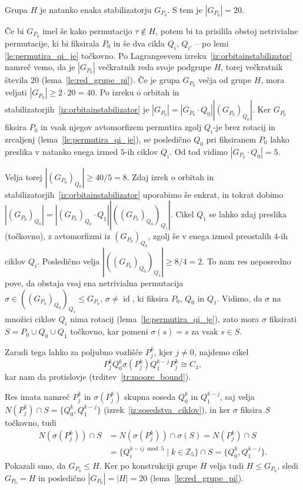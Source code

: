 \documentclass[fin1, tisk]{fmfdelo}
\newcommand{\id}{\operatorname{id}}
\begin{document}
\begin{lema}
    Grupa $H$ je natanko enaka stabilizatorju $G_{P_0}$.
    S tem je $|G_{P_0}| = 20$.
\end{lema}
\begin{dokaz}
    Če bi $G_{P_0}$ imel še kako permutacijo $\tau \not\in H$,
    potem bi ta prisilila obstoj netrivialne permutacije, ki bi fiksirala $P_0$
    in še dva cikla $Q_i$, $Q_{i'}$ -- po lemi \ref{le:permutira_qi_je} točkovno. Po Lagrangeevem izreku~\ref{iz:orbitainstabilizator} 
    namreč vemo, da je $|G_{P_0}|$ večkratnik reda svoje podgrupe $H$, torej večkratnik
    števila $20$ (lema~\ref{le:red_grupe_pi}). Če je grupa $G_{P_0}$ večja od grupe $H$, 
    mora veljati $|G_{P_0}| \geq 2\cdot20 = 40$. Po izreku o orbitah in 
    stabilizatorjih~\ref{iz:orbitainstabilizator} 
    je $|G_{P_0}| = |G_{P_0}\cdot Q_0||(G_{P_0})_{Q_0}|$.
    Ker $G_{P_0}$ fiksira $P_0$ in vsak njegov avtomorfizem permutira zgolj $Q_i$-je brez 
    rotacij in zrcaljenj (lema~\ref{le:permutira_qi_je}), se posledično $Q_0$ pri fiksiranem
    $P_0$ lahko preslika v natanko enega izmed $5$-ih ciklov $Q_i$. Od tod vidimo
    $|G_{P_0}\cdot Q_0| = 5$.

    Velja torej $|(G_{P_0})_{Q_0}| \geq 40 / 5 = 8$. Zdaj izrek o orbitah 
    in stabilizatorjih~\ref{iz:orbitainstabilizator} uporabimo še enkrat, 
    in tokrat dobimo 
    $|(G_{P_0})_{Q_0}| = |(G_{P_0})_{Q_0}\cdot Q_1||((G_{P_0})_{Q_0})_{Q_1}|$.
    Cikel $Q_1$ se lahko zdaj preslika (točkovno), z avtomorfizmi iz $(G_{P_0})_{Q_0}$, zgolj še v enega izmed 
    preostalih $4$-ih ciklov $Q_i$.
    Posledično velja $|((G_{P_0})_{Q_0})_{Q_1}| \geq 8 / 4 = 2$.
    To nam res neposredno pove, da obstaja vsaj ena netrivialna permutacija 
    $\sigma \in ((G_{P_0})_{Q_0})_{Q_1} \leq G_{P_0},\, \sigma \neq\id$, ki fiksira $P_0$, $Q_0$ in $Q_1$. 
    Vidimo, da $\sigma$ na množici ciklov $Q_i$ nima rotacij (lema~\ref{le:permutira_qi_je}), zato
    mora $\sigma$ fiksirati $S = P_0\cup Q_0\cup Q_1$ točkovno, kar pomeni $\sigma(s) = s$ za vsak $s \in S$.
  
    Zaradi tega lahko za poljubno vozlišče $P_j^k$, kjer $j\neq 0$, najdemo cikel
    $$P_j^k Q_0^k \sigma(P^k_j) Q_1^{k-j} P_j^k \cong C_4,$$ kar nam da protislovje (trditev~\ref{tr:moore_bound}).

    Res imata namreč $P_j^k$ in $\sigma(P_j^k)$ skupna soseda $Q_0^k$ in $Q_1^{k-j}$,
    saj velja $N(P_j^k)\cap S = \{Q_0^k, Q_1^{k-j}\}$ (izrek~\ref{iz:sosedstva_ciklov}),
    in ker $\sigma$ fiksira $S$ točkovno, tudi 
    \begin{align*}
    N(\sigma(P_j^k))\cap S &=  N(\sigma(P_j^k))\cap \sigma(S) = N(P_j^k)\cap S 
    \\&= \{Q_i^{k - ij \bmod{5}}\mid k\in\mathbb{Z}_5\}\cap S= \{Q_0^k, Q_1^{k-j}\}.
    \end{align*}
    Pokazali smo, da $G_{P_0} \leq H$. Ker po konstrukciji grupe $H$ velja tudi $H\leq G_{P_0}$, sledi $G_{P_0} = H$ 
    in posledično $|G_{P_0}| = |H| = 20$ (lema~\ref{le:red_grupe_pi}).
\end{dokaz}
\end{document}
